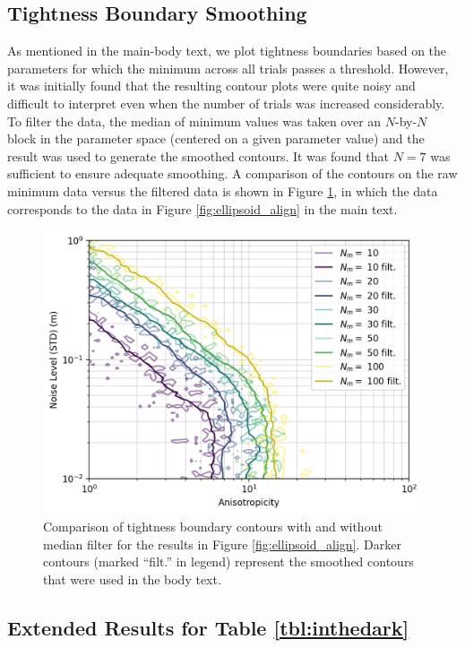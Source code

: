 \documentclass[lettersize,journal]{IEEEtran}
\newcommand{\rev}[1]{\color{red}{#1}\color{black}}
\begin{document}
\subsection{Tightness Boundary Smoothing}\label{App:Smoothing}

As mentioned in the main-body text, we plot tightness boundaries based on the parameters for which the minimum \rev{ER } across all trials passes a threshold. However, it was initially found that the resulting contour plots were quite noisy and difficult to interpret even when the number of trials was increased considerably. To filter the data, the median of minimum \rev{ER } values was taken over an $N$-by-$N$ block in the parameter space (centered on a given parameter value) and the result was used to generate the smoothed contours. It was found that $N=7$ was sufficient to ensure adequate smoothing. A comparison of the contours on the raw minimum \rev{ER } data versus the filtered data is shown in Figure \ref{fig:filter}, in which the data corresponds to the data in Figure \ref{fig:ellipsoid_align} in the main text. 
\begin{figure}[!ht]
	\centering
	\includegraphics[width=\columnwidth]{figs/filter_compare}
	\caption{Comparison of tightness boundary contours with and without median filter for the results in Figure \ref{fig:ellipsoid_align}. Darker contours (marked ``filt.'' in legend) represent the smoothed contours that were used in the body text.}
	\label{fig:filter}
\end{figure}


\subsection{Extended Results for Table \ref{tbl:inthedark}}\label{App:inthedarkExt}
\end{document}
